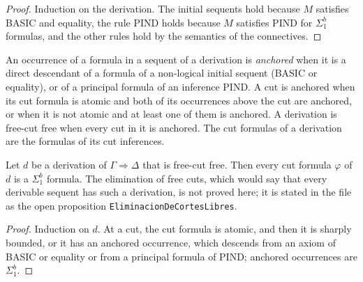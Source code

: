 \begin{proof}
  \leanok
  Induction on the derivation. The initial sequents hold because $M$ satisfies BASIC and equality,
  the rule PIND holds because $M$ satisfies PIND for $\Sigma^b_1$ formulas, and the other rules hold
  by the semantics of the connectives.
\end{proof}

\begin{definition}
  \label{def:arithmetic-free-cut}
  \leanok
  \own{}
  \infrastructure{}
  An occurrence of a formula in a sequent of a derivation is \emph{anchored} when it is a direct
  descendant of a formula of a non-logical initial sequent (BASIC or equality), or of a principal
  formula of an inference PIND. A cut is anchored when its cut formula is atomic and both of its
  occurrences above the cut are anchored, or when it is not atomic and at least one of them is
  anchored. A derivation is free-cut free when every cut in it is anchored. The cut formulas of a
  derivation are the formulas of its cut inferences.
\end{definition}

\begin{theorem}
  \label{thm:arithmetic-cut-sigma1}
  \leanok
  Let $d$ be a derivation of $\Gamma \Rightarrow \Delta$ that is free-cut free. Then every cut
  formula $\varphi$ of $d$ is a $\Sigma^b_1$ formula.
  The elimination of free cuts, which would say that every derivable sequent has such a derivation,
  is not proved here; it is stated in the file as the open proposition
  \texttt{EliminacionDeCortesLibres}.
\end{theorem}

\begin{proof}
  \leanok
  Induction on $d$. At a cut, the cut formula is atomic, and then it is sharply bounded, or it has an
  anchored occurrence, which descends from an axiom of BASIC or equality or from a principal formula
  of PIND; anchored occurrences are $\Sigma^b_1$.
\end{proof}

